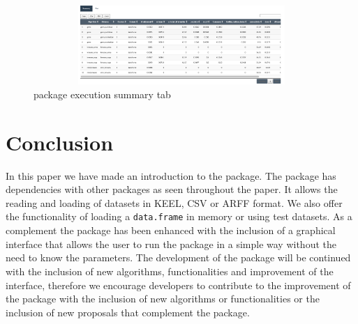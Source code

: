 \begin{enumerate}
\begin{itemize}
  \begin{figure}[]
    \centering
     \includegraphics[width=14cm, height=3cm]{img/tab_summary}
      \caption{ package execution summary tab}
      \label{fig:tab_summary}
  \end{figure}

  \end{itemize}

\end{enumerate}
\newpage
\section{Conclusion}

In this paper we have made an introduction to the  package. The package has dependencies with other packages as seen throughout the paper. It allows the reading and loading of datasets in KEEL, CSV or ARFF format. We also offer the functionality of loading a \texttt{data.frame} in memory or using test datasets. As a complement the package has been enhanced with the inclusion of a graphical interface that allows the user to run the package in a simple way without the need to know the parameters. The development of the package will be continued with the inclusion of new algorithms, functionalities and improvement of the interface, therefore we encourage developers to contribute to the improvement of the package with the inclusion of new algorithms or functionalities or the inclusion of new proposals that complement the package.



\address{Luis Alfonso Pérez Martos\\
  Computer Department\\
  University of Jaén\\
  Spain\\
  (ORCiD if desired)\\
  }

\address{Ángel Miguel García Vico\\
  Computer Department\\
  University of Jaén\\
  Spain\\
  (ORCiD if desired)\\
  }

\address{Pedro González\\
  Computer Department\\
  University of Jaén\\
  Spain\\
  (ORCiD if desired)\\
  }

\address{Cristóbal J. Carmona\\
  Computer Department\\
  University of Jaén\\
  Spain\\
  (ORCiD if desired)\\
  }

